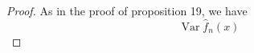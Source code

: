 \documentclass{article}
\theoremstyle{plain}
\theoremstyle{remark}
\DeclareMathOperator{\Var}{Var}
\begin{document}
\begin{proof}
	As in the proof of proposition 19, we have
	\[
	\Var \hat f_n(x) %
	\]
\end{proof}
\end{document}
